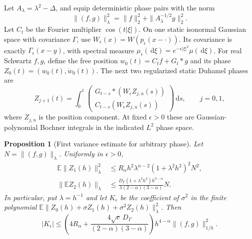 \documentclass[12pt,oneside,openany]{book}
\numberwithin{equation}{section}
\newtheorem{proposition}[theorem]{Proposition}
\theoremstyle{nogostyle}
\theoremstyle{definition}
\newcommand{\E}{\mathbb{E}}
\newcommand{\ud}{\,\mathrm{d}}
\begin{document}
Let $A_\lambda = \lambda^2-\Delta$, and equip deterministic phase pairs with the
norm
\begin{equation}\label{E:phase-norm}
  \|(f,g)\|_\lambda^2
  =\|f\|_2^2+\|A_\lambda^{-1/2}g\|_2^2.
\end{equation}
Let $C_t$ be the Fourier multiplier $\cos(t|\xi|)$. On one static isonormal
Gaussian space with covariance $\Gamma$, use $W_\epsilon(x) =
W(p_\epsilon(x-\cdot))$. Its covariance is exactly $\Gamma_\epsilon(x-y)$, with
spectral measure $\mu_\epsilon(\ud\xi) = e^{-\epsilon|\xi|^2}\mu(\ud\xi)$. For
real Schwartz $f,g$, define the free position $w_0(t) = C_tf+G_t*g$ and its
phase $Z_0(t) = (w_0(t),\dot{w}_0(t))$. The next two regularized static Duhamel
phases are
\begin{equation}\label{E:phase-duhamel}
  Z_{j+1}(t)
  =\int_0^t
  \begin{pmatrix}
    G_{t-s}*(W_\epsilon Z_{j,u}(s))\\
    C_{t-s}(W_\epsilon Z_{j,u}(s))
  \end{pmatrix}\ud s,\qquad j=0,1,
\end{equation}
where $Z_{j,u}$ is the position component. At fixed $\epsilon > 0$ these are
Gaussian-polynomial Bochner integrals in the indicated $L^2$ phase space.

\begin{proposition}[First variance estimate for arbitrary phase]
  \label{P:static-phase-variance}
  Let $N = \|(f,g)\|_\lambda$. Uniformly in $\epsilon > 0$,
  \begin{align}
    \E\|Z_1(h)\|_\lambda^2
    &\le R_\alpha h^2\lambda^{\alpha-2}
    (1+\lambda^2h^2)^2N^2,\label{E:phase-born}\\
    \|\E Z_2(h)\|_\lambda
    &\le\frac{D_\Gamma(1+\lambda^2h^2)h^{3-\alpha}}
    {\lambda(2-\alpha)(3-\alpha)}N.
    \label{E:phase-mean}
  \end{align}
  In particular, put $\lambda = h^{-1}$ and let $K_\epsilon$ be the coefficient
  of $\sigma^2$ in the finite polynomial $\E\|Z_0(h)+\sigma
  Z_1(h)+\sigma^2Z_2(h)\|_\lambda^2$. Then
  \begin{equation}\label{E:phase-variance}
    |K_\epsilon|
    \le\left(4R_\alpha+
    \frac{4\sqrt e\,D_\Gamma}{(2-\alpha)(3-\alpha)}\right)
    h^{4-\alpha}\|(f,g)\|_{1/h}^2.
  \end{equation}
\end{proposition}
\end{document}
